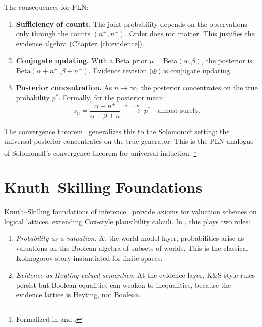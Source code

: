 \documentclass[11pt,openany]{report}
\begin{document}
The consequences for PLN:
\begin{enumerate}
\item \textbf{Sufficiency of counts.}  The joint probability depends
  on the observations only through the counts $(n^+, n^-)$.  Order
  does not matter.  This justifies the evidence algebra
  (Chapter~\ref{ch:evidence}).

\item \textbf{Conjugate updating.}  With a Beta prior
  $\mu = \mathrm{Beta}(\alpha, \beta)$, the posterior is
  $\mathrm{Beta}(\alpha + n^+, \beta + n^-)$.  Evidence revision
  ($\oplus$) is conjugate updating.

\item \textbf{Posterior concentration.}  As $n \to \infty$, the
  posterior concentrates on the true probability $p^*$.
  Formally, for the posterior mean:
  \[
    s_n = \frac{\alpha + n^+}{\alpha + \beta + n} \;\xrightarrow{n \to \infty}\; p^*
    \quad \text{almost surely.}
  \]
\end{enumerate}

The \nuPLN{} convergence theorem~\cite{nuPLN2026} generalizes this
to the Solomonoff setting: the universal posterior concentrates on the
true generator.  This is the PLN analogue of Solomonoff's convergence
theorem for universal induction.%
\footnote{Formalized in  and
  .}

\section{Knuth--Skilling Foundations}
\label{sec:knuth-skilling}

Knuth--Skilling foundations of inference~\cite{KnuthSkilling2012} provide
axioms for valuation schemes on logical lattices, extending Cox-style
plausibility calculi.  In \xiPLN{}, this plays two roles:

\begin{enumerate}
\item \emph{Probability as a valuation.}  At the world-model layer,
  probabilities arise as valuations on the Boolean algebra of subsets of
  worlds.  This is the classical Kolmogorov story instantiated for finite
  spaces.

\item \emph{Evidence as Heyting-valued semantics.}  At the evidence
  layer, K\&S-style rules persist but Boolean equalities can weaken to
  inequalities, because the evidence lattice is Heyting, not Boolean.
\end{enumerate}
\end{document}
